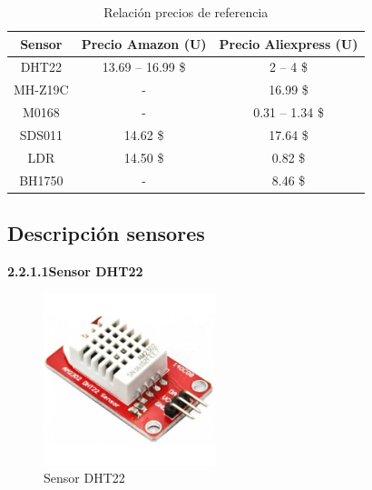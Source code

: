 \begin{table}[H]
    \centering
    \caption{Relación precios de referencia}
    \begin{tabular}{|c|c|c|}
    \hline
    \textbf{Sensor} & \textbf{Precio Amazon (U)} & \textbf{Precio Aliexpress (U)} \\ \hline
    DHT22           & 13.69 – 16.99 \$           & 2 – 4 \$                       \\ \hline
    MH-Z19C         & -                          & 16.99 \$                       \\ \hline
    M0168           & -                          & 0.31 – 1.34 \$                 \\ \hline
    SDS011          & 14.62 \$                   & 17.64 \$                       \\ \hline
    LDR             & 14.50 \$                   & 0.82 \$                        \\ \hline
    BH1750          & -                          & 8.46 \$                        \\ \hline
    \end{tabular}
    \label{tab: precios_referencia}
\end{table}

\subsection{Descripción sensores} \label{subsec: descripcion_sensores}

        \textbf{2.2.1.1\hspace{5mm}Sensor DHT22}

  \begin{figure}[H]
      \centering
      \includegraphics[width=5cm, height=5cm]{imagenes/dht22.jpg}
      \caption{Sensor DHT22}
      \label{imag:dht22}
   \end{figure}
   
